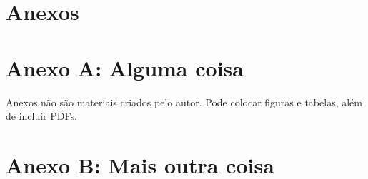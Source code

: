 \centering
\onecolumn
\section*{Anexos}

\section*{Anexo A: Alguma coisa}
\label{secao:AnexoA}

Anexos não são materiais criados pelo autor.
Pode colocar figuras e tabelas, além de incluir PDFs.

\break

\section*{Anexo B: Mais outra coisa}
\label{secao:AnexoB}

